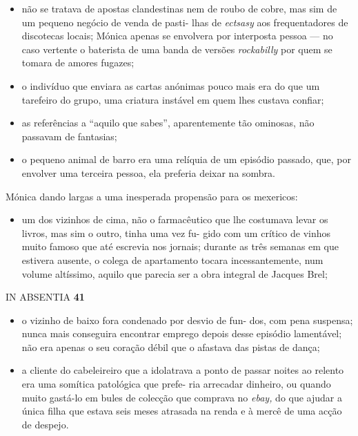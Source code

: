\begin{itemize}
\tightlist
\item
  não se tratava de apostas clandestinas nem de roubo de cobre, mas sim
  de um pequeno negócio de venda de pasti- lhas de \emph{ectsasy }aos
  frequentadores de discotecas locais; Mónica apenas se envolvera por
  interposta pessoa --- no caso vertente o baterista de uma banda de
  versões \emph{rockabilly }por quem se tomara de amores fugazes;
\item
  o indivíduo que enviara as cartas anónimas pouco mais era do que um
  tarefeiro do grupo, uma criatura instável em quem lhes custava
  confiar;
\item
  as referências a ``aquilo que sabes'', aparentemente tão ominosas, não
  passavam de fantasias;
\item
  o pequeno animal de barro era uma relíquia de um episódio passado,
  que, por envolver uma terceira pessoa, ela preferia deixar na sombra.
\end{itemize}

Mónica dando largas a uma inesperada propensão para os mexericos:

\begin{itemize}
\tightlist
\item
  um dos vizinhos de cima, não o farmacêutico que lhe costumava levar os
  livros, mas sim o outro, tinha uma vez fu- gido com um crítico de
  vinhos muito famoso que até escrevia nos jornais; durante as três
  semanas em que estivera ausente, o colega de apartamento tocara
  incessantemente, num volume altíssimo, aquilo que parecia ser a obra
  integral de Jacques Brel;
\end{itemize}

IN ABSENTIA \textbf{41}

\begin{itemize}
\tightlist
\item
  o vizinho de baixo fora condenado por desvio de fun- dos, com pena
  suspensa; nunca mais conseguira encontrar emprego depois desse
  episódio lamentável; não era apenas o seu coração débil que o afastava
  das pistas de dança;
\item
  a cliente do cabeleireiro que a idolatrava a ponto de passar noites ao
  relento era uma somítica patológica que prefe- ria arrecadar dinheiro,
  ou quando muito gastá-lo em bules de colecção que comprava no
  \emph{ebay, }do que ajudar a única filha que estava seis meses
  atrasada na renda e à mercê de uma acção de despejo.
\end{itemize}

